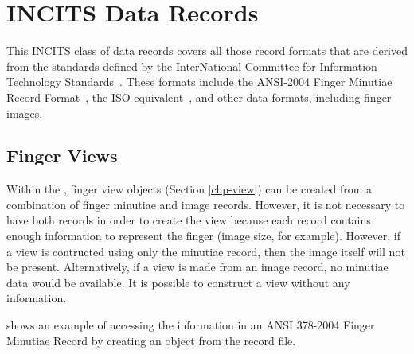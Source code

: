 \section{INCITS Data Records}
\label{sec-incitsdatarecords}

This INCITS class of data records covers all those record formats that are
derived from the standards defined by the InterNational Committee for
Information Technology Standards~\cite{org:incits}. These formats include the
ANSI-2004 Finger Minutiae Record Format~\cite{std:ansi378-2004}, the ISO
equivalent~\cite{std:iso19794-2}, and other data formats, including finger
images.

\subsection{Finger Views}
\label{sec-incitsfingerviews}
Within the \sname, finger view objects (Section \ref{chp-view}) can be 
created from a combination of finger minutiae and image records. However, it
is not necessary to have both records in order to create the view because each
record contains enough information to represent the finger (image size, for
example). However, if a view is contructed using only the minutiae record, then
the image itself will not be present. Alternatively, if a view is made from
an image record, no minutiae data would be available. It is possible to
construct a view without any information.

 shows an example of accessing the information
in an ANSI 378-2004 Finger Minutiae Record by creating an 
object from the record file.
